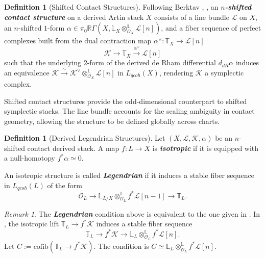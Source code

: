 \documentclass[reqno]{amsart}
\theoremstyle{definition}
\newtheorem{definition}[theorem]{Definition}
\theoremstyle{remark}
\newtheorem{remark}[theorem]{Remark}
\newcommand{\LL}{\mathbb{L}}
\newcommand{\TT}{\mathbb{T}}
\newcommand{\cO}{\mathcal{O}}
\newcommand{\cL}{\mathcal{L}}
\newcommand{\cK}{\mathcal{K}}
\newcommand{\bfem}[1]{\textbf{\textit{#1}}}
\begin{document}
{\begin{definition}[Shifted Contact Structures]
  Following Berktav \cite[Section 3.2]{Berktav1}, \cite[Definition 2.17]{Berktav2}, an \bfem{$n$-shifted contact structure} on a derived Artin stack $X$ consists of a line bundle $\cL$ on $X$, an $n$-shifted $1$-form $\alpha \in \pi_0 \mathbb{R}\Gamma(X, \LL_X \otimes^{\mathbb{L}}_{\cO_X} \cL[n])$, and a fiber sequence of perfect complexes built from the dual contraction map $\alpha^\vee \colon \TT_X \to \cL[n]$
  \begin{equation} \label{eq:contact_dist}
    \cK \to \TT_X \xrightarrow{\alpha^\vee} \cL[n]
  \end{equation}
  such that the underlying 2-form of the derived de Rham differential $d_{dR}\alpha$ induces an equivalence $\cK \xrightarrow{\sim} \cK^\vee \otimes^{\mathbb{L}}_{\cO_X} \cL[n]$ in $L_{qcoh}(X)$, rendering $\cK$ a symplectic complex.
\end{definition}

Shifted contact structures provide the
odd-dimensional counterpart to shifted symplectic
stacks. The line bundle accounts for the scaling ambiguity in contact
geometry, allowing the structure to be defined globally
across charts.

\begin{definition}[Derived Legendrian Structures]\label{definition:legendrian structures}
  Let $(X, \cL, \cK, \alpha)$ be an $n$-shifted contact derived stack. A map $f \colon L \to X$ is \bfem{isotropic} if it is equipped with a null-homotopy $f^*\alpha \simeq 0$. 

  An isotropic structure is called \bfem{Legendrian} if it induces a stable fiber sequence in $L_{qcoh}(L)$ of the form
  \begin{equation*}
    \cO_L \to \LL_{L/X} \otimes^{\mathbb{L}}_{\cO_L} f^*\cL[n-1] \to \TT_L.
  \end{equation*}
\end{definition}

\begin{remark}
  The \bfem{Legendrian} condition above is equivalent to the one given in \cite[Section 3.3]{Berktav3}. In \cite{Berktav3}, the isotropic lift $\TT_L \to f^*\cK$ induces a stable fiber sequence
  \begin{equation*}
    \TT_L \to f^*\cK \to \LL_L \otimes^{\mathbb{L}}_{\cO_L} f^*\cL[n].
  \end{equation*}
  Let $C := \mathrm{cofib}(\TT_L \to f^*\cK)$. The condition is $C \simeq \LL_L \otimes^{\mathbb{L}}_{\cO_L} f^*\cL[n]$.


\end{remark}}
\end{document}
